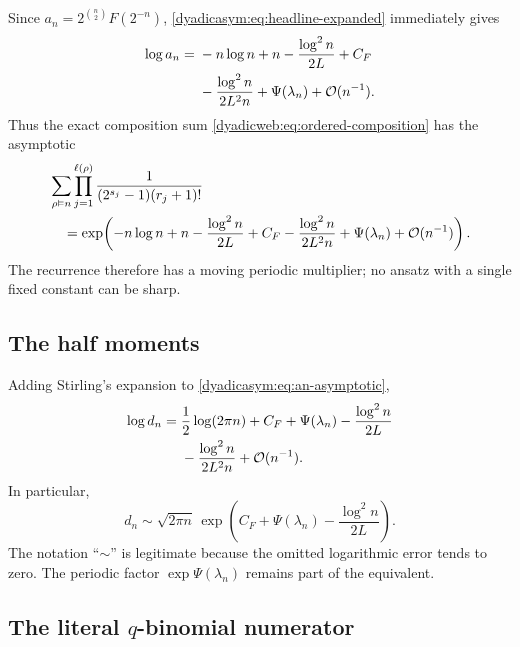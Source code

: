 \documentclass[11pt,oneside]{article}
\theoremstyle{definition}
\theoremstyle{remark}
\newcommand{\bigO}{\mathcal O}
\begin{document}
Since $a_n=2^{\binom n2}F(2^{-n})$, \eqref{dyadicasym:eq:headline-expanded} immediately gives
\begin{align}
 \log a_n={}&-n\log n+n-\frac{\log^2n}{2L}+C_F             \notag\\
 &-\frac{\log^2n}{2L^2n}+\Psi(\lambda_n)+\bigO(n^{-1}).   \label{dyadicasym:eq:an-asymptotic}
\end{align}
Thus the exact composition sum \eqref{dyadicweb:eq:ordered-composition} has the asymptotic
\begin{align}
 &\sum_{\rho\vDash n}
 \prod_{j=1}^{\ell(\rho)}
 \frac{1}{(2^{s_j}-1)(r_j+1)!}                             \notag\\
 &\quad=\exp\!\left(
 -n\log n+n-\frac{\log^2n}{2L}+C_F
 -\frac{\log^2n}{2L^2n}+\Psi(\lambda_n)
 +\bigO(n^{-1})\right).                                    \label{dyadicasym:eq:composition-asymptotic}
\end{align}
The recurrence therefore has a moving periodic multiplier; no ansatz with a single fixed
constant can be sharp.

\subsection{The half moments}

Adding Stirling's expansion to \eqref{dyadicasym:eq:an-asymptotic},
\begin{align}
 \log d_n={}&\frac12\log(2\pi n)+C_F+\Psi(\lambda_n)
 -\frac{\log^2n}{2L}                                      \notag\\
 &-\frac{\log^2n}{2L^2n}+\bigO(n^{-1}).                   \label{dyadicasym:eq:dn-asymptotic}
\end{align}
In particular,
\begin{equation}
 d_n\sim\sqrt{2\pi n}\,
 \exp\!\left(C_F+\Psi(\lambda_n)-\frac{\log^2n}{2L}\right).
                                                                    \label{dyadicasym:eq:dn-equivalent}
\end{equation}
The notation ``$\sim$'' is legitimate because the omitted logarithmic error tends to zero.
The periodic factor $\exp\Psi(\lambda_n)$ remains part of the equivalent.

\subsection{The literal \texorpdfstring{$q$}{q}-binomial numerator}
\end{document}
